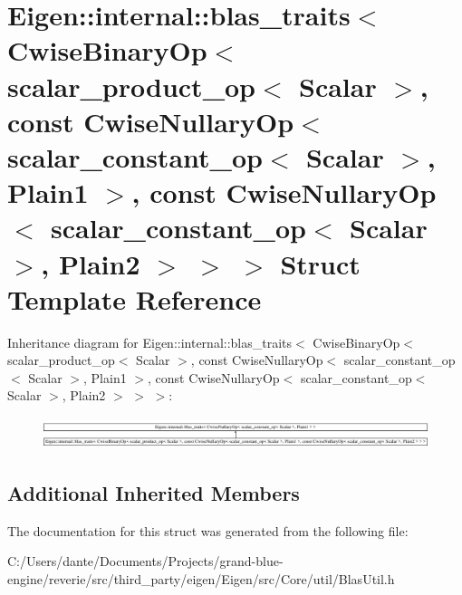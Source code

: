 \hypertarget{struct_eigen_1_1internal_1_1blas__traits_3_01_cwise_binary_op_3_01scalar__product__op_3_01_scala720e6aa72051d527ea4818c5301d9b21}{}\section{Eigen\+::internal\+::blas\+\_\+traits$<$ Cwise\+Binary\+Op$<$ scalar\+\_\+product\+\_\+op$<$ Scalar $>$, const Cwise\+Nullary\+Op$<$ scalar\+\_\+constant\+\_\+op$<$ Scalar $>$, Plain1 $>$, const Cwise\+Nullary\+Op$<$ scalar\+\_\+constant\+\_\+op$<$ Scalar $>$, Plain2 $>$ $>$ $>$ Struct Template Reference}
\label{struct_eigen_1_1internal_1_1blas__traits_3_01_cwise_binary_op_3_01scalar__product__op_3_01_scala720e6aa72051d527ea4818c5301d9b21}
Inheritance diagram for Eigen\+::internal\+::blas\+\_\+traits$<$ Cwise\+Binary\+Op$<$ scalar\+\_\+product\+\_\+op$<$ Scalar $>$, const Cwise\+Nullary\+Op$<$ scalar\+\_\+constant\+\_\+op$<$ Scalar $>$, Plain1 $>$, const Cwise\+Nullary\+Op$<$ scalar\+\_\+constant\+\_\+op$<$ Scalar $>$, Plain2 $>$ $>$ $>$\+:\begin{figure}[H]
\begin{center}
\leavevmode
\includegraphics[height=0.921053cm]{struct_eigen_1_1internal_1_1blas__traits_3_01_cwise_binary_op_3_01scalar__product__op_3_01_scala720e6aa72051d527ea4818c5301d9b21}
\end{center}
\end{figure}
\subsection*{Additional Inherited Members}


The documentation for this struct was generated from the following file\+:\begin{DoxyCompactItemize}
\item 
C\+:/\+Users/dante/\+Documents/\+Projects/grand-\/blue-\/engine/reverie/src/third\+\_\+party/eigen/\+Eigen/src/\+Core/util/Blas\+Util.\+h\end{DoxyCompactItemize}
